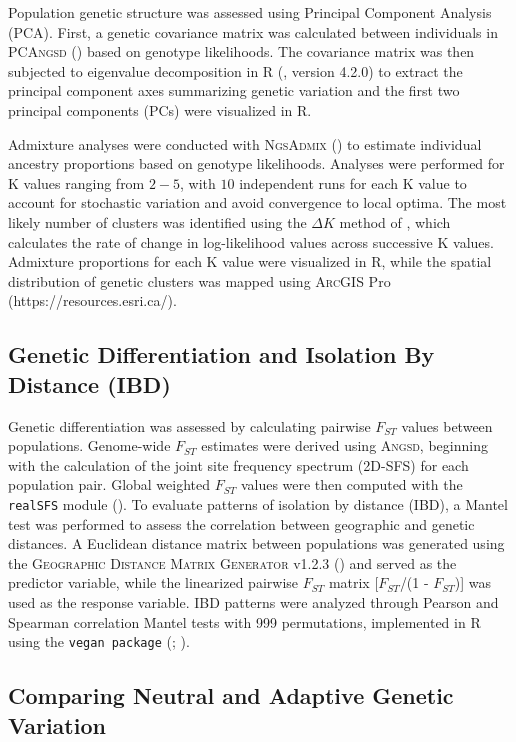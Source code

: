\documentclass[9pt,a4paper,twoside]{rho-class/rho}
\begin{document}
        Population genetic structure was assessed using Principal Component Analysis (PCA). First, a genetic covariance matrix was calculated between individuals in \textsc{PCAngsd} (\cite{Meisner2018}) based on genotype likelihoods. The covariance matrix was then subjected to eigenvalue decomposition in R (\cite{R2024}, version 4.2.0) to extract the principal component axes summarizing genetic variation and the first two principal components (PCs) were visualized in R.
       
        Admixture analyses were conducted with \textsc{NgsAdmix} (\cite{Skotte2013}) to estimate individual ancestry proportions based on genotype likelihoods. Analyses were performed for K values ranging from $2-5$, with $10$ independent runs for each K value to account for stochastic variation and avoid convergence to local optima. The most likely number of clusters was identified using the $\Delta{K}$ method of \cite{Evanno2005}, which calculates the rate of change in log-likelihood values across successive K values. Admixture proportions for each K value were visualized in R, while the spatial distribution of genetic clusters was mapped using \textsc{ArcGIS} Pro (https://resources.esri.ca/).

    \subsection{Genetic Differentiation and Isolation By Distance (IBD)}

        Genetic differentiation was assessed by calculating pairwise $F_{ST}$ values between populations. Genome-wide $F_{ST}$ estimates were derived using \textsc{Angsd}, beginning with the calculation of the joint site frequency spectrum (2D-SFS) for each population pair. Global weighted $F_{ST}$ values were then computed with the \texttt{realSFS} module (\cite{Nielsen2012}). To evaluate patterns of isolation by distance (IBD), a Mantel test was performed to assess the correlation between geographic and genetic distances. A Euclidean distance matrix between populations was generated using the \textsc{Geographic Distance Matrix Generator} v1.2.3 (\Cite{Ersts2024}) and served as the predictor variable, while the linearized pairwise $F_{ST}$ matrix [$F_{ST}$/(1 - $F_{ST}$)] was used as the response variable. IBD patterns were analyzed through Pearson and Spearman correlation Mantel tests with 999 permutations, implemented in R using the \texttt{vegan package} (\cite{Oksanen2001}; \cite{Mantel1967}).
 
    \subsection{Comparing Neutral and Adaptive Genetic Variation}
\end{document}
